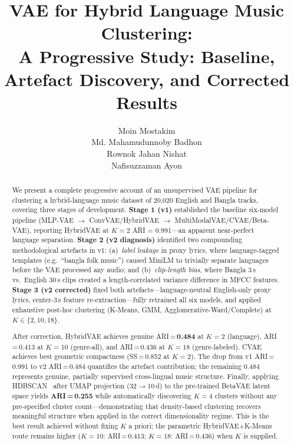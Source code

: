 \documentclass{article}
\title{VAE for Hybrid Language Music Clustering:\\
A Progressive Study: Baseline, Artefact Discovery, and Corrected Results}
\author{%
  Moin Mostakim \\
  Md. Mahamudunnoby Badhon \\
  Rownok Jahan Nishat \\
  Nafisuzzaman Ayon
}
\begin{document}
\graphicspath{{figures/}}

\maketitle

\begin{abstract}
We present a complete progressive account of an unsupervised VAE pipeline for
clustering a hybrid-language music dataset of 20,020 English and Bangla tracks,
covering three stages of development. \textbf{Stage 1 (v1)} established the baseline
six-model pipeline (MLP-VAE $\to$ ConvVAE/HybridVAE $\to$ MultiModalVAE/CVAE/Beta-VAE),
reporting HybridVAE at $K\!=\!2$ ARI = 0.991---an apparent near-perfect language
separation. \textbf{Stage 2 (v2 diagnosis)} identified two compounding methodological
artefacts in v1: (a)~\emph{label leakage} in proxy lyrics, where language-tagged
templates (e.g.\ ``bangla folk music'') caused MiniLM to trivially separate languages
before the VAE processed any audio; and (b)~\emph{clip-length bias}, where Bangla 3\,s
vs.\ English 30\,s clips created a length-correlated variance difference in MFCC
features. \textbf{Stage 3 (v2 corrected)} fixed both artefacts---language-neutral
English-only proxy lyrics, center-3\,s feature re-extraction---fully retrained all six
models, and applied exhaustive post-hoc clustering (K-Means, GMM,
Agglomerative-Ward/Complete) at $K\!\in\!\{2,10,18\}$.

After correction, HybridVAE achieves genuine ARI\,=\,\textbf{0.484} at $K\!=\!2$
(language), ARI\,=\,0.413 at $K\!=\!10$ (genre-all), and ARI\,=\,0.436 at $K\!=\!18$
(genre-labeled). CVAE achieves best geometric compactness (SS\,=\,0.852 at $K\!=\!2$).
The drop from v1 ARI\,=\,0.991 to v2 ARI\,=\,0.484 quantifies the artefact contribution;
the remaining 0.484 represents genuine, partially supervised cross-lingual music structure.
Finally, applying HDBSCAN~\cite{campello2013density} after UMAP projection ($32\!\to\!10$\,d)
to the pre-trained BetaVAE latent space yields \textbf{ARI\,=\,0.255} while automatically
discovering $K\!=\!4$ clusters without any pre-specified cluster count---demonstrating that
density-based clustering recovers meaningful structure when applied in the correct
dimensionality regime. This is the best result achieved without fixing $K$ a priori;
the parametric HybridVAE+K-Means route remains higher ($K\!=\!10$: ARI\,=\,0.413;
$K\!=\!18$: ARI\,=\,0.436) when $K$ is supplied.
\end{abstract}
\end{document}
